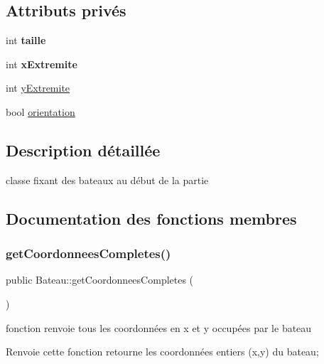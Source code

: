 \subsection*{Attributs privés}
\begin{DoxyCompactItemize}
\item 
\mbox{\label{class_bateau_a1dd818ea44eed67f756400eaac344a95}} 
int {\bfseries taille}
\item 
\mbox{\label{class_bateau_ab63ce4226907ed0961b47eded901658e}} 
int {\bfseries x\+Extremite}
\item 
int \mbox{\hyperlink{class_bateau_a32294182fa76970d9be2c4de5d8329e6}{y\+Extremite}}
\item 
bool \mbox{\hyperlink{class_bateau_a2d3074370ff0c372286522f298830f63}{orientation}}
\end{DoxyCompactItemize}


\subsection{Description détaillée}
classe fixant des bateaux au début de la partie 

\subsection{Documentation des fonctions membres}
\mbox{\label{class_bateau_a55c31fbdc2dc0c92786583d9bbd14985}} 
\subsubsection{\texorpdfstring{get\+Coordonnees\+Completes()}{getCoordonneesCompletes()}}
{\footnotesize\ttfamily public Bateau\+::get\+Coordonnees\+Completes (\begin{DoxyParamCaption}{ }\end{DoxyParamCaption})}



fonction renvoie tous les coordonnées en x et y occupées par le bateau 

\begin{DoxyReturn}{Renvoie}
cette fonction retourne les coordonnées entiers (x,y) du bateau; 
\end{DoxyReturn}
\mbox{\label{class_bateau_a693e60e6b97d17a04b3f10de4e68f741}} 
